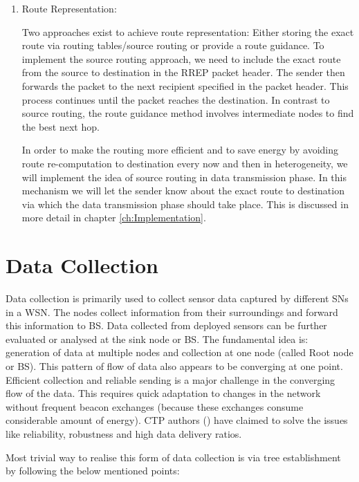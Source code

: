 \begin{enumerate}
    \item Route Representation:
    
    Two approaches exist to achieve route representation: Either storing the exact route via routing tables/source routing or provide a route guidance. To implement the source routing approach, we need to include the exact route from the source to destination in the \ac{RREP} packet header. The sender then forwards the packet to the next recipient specified in the packet header. This process continues until the packet reaches the destination. In contrast to source routing, the route guidance method involves intermediate nodes to find the best next hop.
    
    In order to make the routing more efficient and to save energy by avoiding route re-computation to destination every now and then in heterogeneity, we will implement the idea of source routing in data transmission phase. In this mechanism we will let the sender know about the exact route to destination via which the data transmission phase should take place. This is discussed in more detail in chapter \ref{ch:Implementation}.
    
\end{enumerate}

\section{Data Collection}

Data collection is primarily used to collect sensor data captured by different \acp{SN} in a \ac{WSN}. The nodes collect information from their surroundings and forward this information to \ac{BS}. Data collected from deployed sensors can be further evaluated or analysed at the sink node or \ac{BS}. The fundamental idea is: generation of data at multiple nodes and collection at one node (called Root node or \ac{BS}). This pattern of flow of data also appears to be converging at one point. Efficient collection and reliable sending is a major challenge in the converging flow of the data. This requires quick adaptation to changes in the network without frequent beacon exchanges (because these exchanges consume considerable amount of energy). \ac{CTP} authors (\cite{TEP:119}) have claimed to solve the issues like reliability, robustness and high data delivery ratios.

\par
Most trivial way to realise this form of data collection is via tree establishment by following the below mentioned points:

